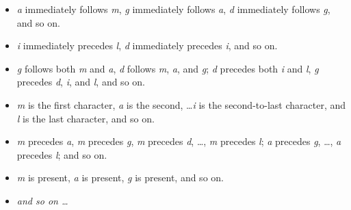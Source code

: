 \begin{itemize}
  \item \textit{a} immediately follows \textit{m}, \textit{g} immediately follows \textit{a}, \textit{d} immediately follows \textit{g}, and so on. 
  \item \textit{i} immediately precedes \textit{l}, \textit{d} immediately precedes \textit{i}, and so on. %
   \item \textit{g} follows both \textit{m} and \textit{a}, \textit{d} follows \textit{m}, \textit{a}, and \textit{g}; \textit{d} precedes both \textit{i} and \textit{l}, \textit{g} precedes \textit{d}, \textit{i}, and \textit{l}, and so on.
   \item \textit{m} is the first character, \textit{a} is the second, \dots \textit{i} is the second-to-last character, and \textit{l} is the last character, and so on.
   \item \textit{m} precedes \textit{a}, \textit{m} precedes \textit{g}, \textit{m} precedes \textit{d}, \dots, \textit{m} precedes \textit{l}; \textit{a} precedes \textit{g}, \dots , \textit{a} precedes \textit{l}; and so on.
   \item \textit{m} is present, \textit{a} is present, \textit{g} is present, and so on.
   \item \emph{and so on \dots}
\end{itemize}
